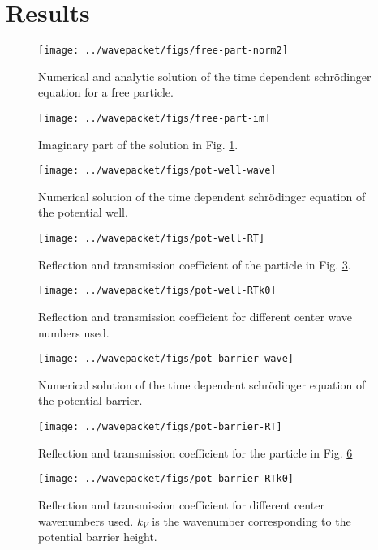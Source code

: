 \section{Results}

\begin{figure}[H]
  \centering
  \texttt{[image: ../wavepacket/figs/free-part-norm2]}
  \caption{Numerical and analytic solution of the time dependent schrödinger equation for a free particle.}
  \label{fig:free-norm}
\end{figure}

\begin{figure}[H]
  \centering
  \texttt{[image: ../wavepacket/figs/free-part-im]}
  \caption{Imaginary part of the solution in Fig. \ref{fig:free-norm}.}
  \label{fig:free-imag}
\end{figure}

\begin{figure}[H]
  \centering
  \texttt{[image: ../wavepacket/figs/pot-well-wave]}
  \caption{Numerical solution of the time dependent schrödinger equation of the potential well.}
  \label{fig:well-wave}
\end{figure}

\begin{figure}[H]
  \centering
  \texttt{[image: ../wavepacket/figs/pot-well-RT]}
  \caption{Reflection and transmission coefficient of the particle in Fig. \ref{fig:well-wave}.}
  \label{fig:well-RT}
\end{figure}

\begin{figure}[H]
  \centering
  \texttt{[image: ../wavepacket/figs/pot-well-RTk0]}
  \caption{Reflection and transmission coefficient for different center wave numbers used.}
  \label{fig:well-k0}
\end{figure}

\begin{figure}[H]
  \centering
  \texttt{[image: ../wavepacket/figs/pot-barrier-wave]}
  \caption{Numerical solution of the time dependent schrödinger equation of the potential barrier.}
  \label{fig:barrier-wave}
\end{figure}

\begin{figure}[H]
  \centering
  \texttt{[image: ../wavepacket/figs/pot-barrier-RT]}
  \caption{Reflection and transmission coefficient for the particle in Fig. \ref{fig:barrier-wave}}
  \label{fig:barrier-RT}
\end{figure}

\begin{figure}[H]
  \centering
  \texttt{[image: ../wavepacket/figs/pot-barrier-RTk0]}
  \caption{Reflection and transmission coefficient for different center wavenumbers used. $k_V$ is the wavenumber corresponding to the potential barrier height.}
  \label{fig:barrier-k0}
\end{figure}

